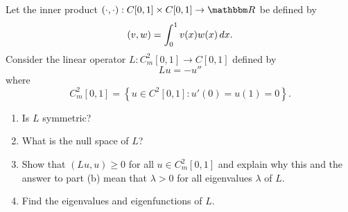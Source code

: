 Let the inner product $\ip{\cdot,\cdot}:C[0,1]\times C[0,1]\to\R$ be defined by
\[
(v,w)=\int_0^1v(x)w(x)\,dx.
\]
Consider the linear operator $L:C_m^2[0,1] \to C[0,1]$ defined by
\[
L u = -u''
\]
where 
\[
C_m^2[0,1] = \left\{ u\in C^2[0,1]: u'(0) = u(1) = 0\right\}.
\]
\begin{enumerate}
\item Is $L$ symmetric?
\\
\item What is the null space of $L$?
\\
\item Show that $(L u,u)\ge 0$ for all $u\in C_m^2[0,1]$ and explain why this and the answer to part (b) mean that $\lambda > 0$ for all eigenvalues $\lambda$ of $L$.
\\
\item Find the eigenvalues and eigenfunctions of $L$.
\end{enumerate}



